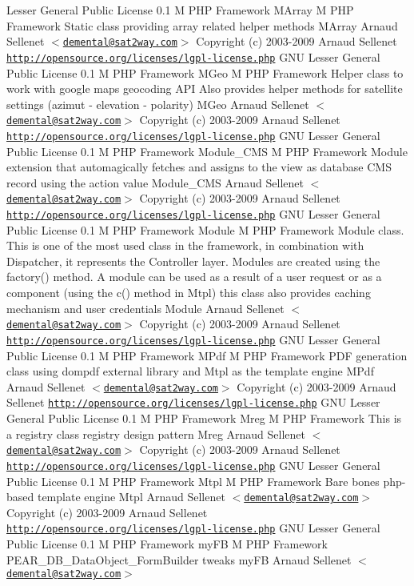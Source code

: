 \begin{Desc}
Lesser General Public License  0.1  M PHP Framework   MArray  M PHP Framework  Static class providing array related helper methods   MArray  Arnaud Sellenet $<$\href{mailto:demental@sat2way.com}{\tt demental@sat2way.com}$>$  Copyright (c) 2003-2009 Arnaud Sellenet  \href{http://opensource.org/licenses/lgpl-license.php}{\tt http://opensource.org/licenses/lgpl-license.php} GNU Lesser General Public License  0.1  M PHP Framework   MGeo  M PHP Framework  Helper class to work with google maps geocoding API Also provides helper methods for satellite settings (azimut - elevation - polarity)   MGeo  Arnaud Sellenet $<$\href{mailto:demental@sat2way.com}{\tt demental@sat2way.com}$>$  Copyright (c) 2003-2009 Arnaud Sellenet  \href{http://opensource.org/licenses/lgpl-license.php}{\tt http://opensource.org/licenses/lgpl-license.php} GNU Lesser General Public License  0.1  M PHP Framework   Module\_\-CMS  M PHP Framework  Module extension that automagically fetches and assigns to the view as database CMS record using the action value   Module\_\-CMS  Arnaud Sellenet $<$\href{mailto:demental@sat2way.com}{\tt demental@sat2way.com}$>$  Copyright (c) 2003-2009 Arnaud Sellenet  \href{http://opensource.org/licenses/lgpl-license.php}{\tt http://opensource.org/licenses/lgpl-license.php} GNU Lesser General Public License  0.1  M PHP Framework   Module  M PHP Framework  Module class. This is one of the most used class in the framework, in combination with Dispatcher, it represents the Controller layer. Modules are created using the factory() method. A module can be used as a result of a user request or as a component (using the c() method in Mtpl) this class also provides caching mechanism and user credentials   Module  Arnaud Sellenet $<$\href{mailto:demental@sat2way.com}{\tt demental@sat2way.com}$>$  Copyright (c) 2003-2009 Arnaud Sellenet  \href{http://opensource.org/licenses/lgpl-license.php}{\tt http://opensource.org/licenses/lgpl-license.php} GNU Lesser General Public License  0.1  M PHP Framework   MPdf  M PHP Framework  PDF generation class using dompdf external library and Mtpl as the template engine   MPdf  Arnaud Sellenet $<$\href{mailto:demental@sat2way.com}{\tt demental@sat2way.com}$>$  Copyright (c) 2003-2009 Arnaud Sellenet  \href{http://opensource.org/licenses/lgpl-license.php}{\tt http://opensource.org/licenses/lgpl-license.php} GNU Lesser General Public License  0.1  M PHP Framework   Mreg  M PHP Framework  This is a registry class  registry design pattern   Mreg  Arnaud Sellenet $<$\href{mailto:demental@sat2way.com}{\tt demental@sat2way.com}$>$  Copyright (c) 2003-2009 Arnaud Sellenet  \href{http://opensource.org/licenses/lgpl-license.php}{\tt http://opensource.org/licenses/lgpl-license.php} GNU Lesser General Public License  0.1  M PHP Framework   Mtpl  M PHP Framework  Bare bones php-based template engine   Mtpl  Arnaud Sellenet $<$\href{mailto:demental@sat2way.com}{\tt demental@sat2way.com}$>$  Copyright (c) 2003-2009 Arnaud Sellenet  \href{http://opensource.org/licenses/lgpl-license.php}{\tt http://opensource.org/licenses/lgpl-license.php} GNU Lesser General Public License  0.1  M PHP Framework   myFB  M PHP Framework  PEAR\_\-DB\_\-DataObject\_\-FormBuilder tweaks   myFB  Arnaud Sellenet $<$\href{mailto:demental@sat2way.com}{\tt demental@sat2way.com}$>$  
\end{Desc}

